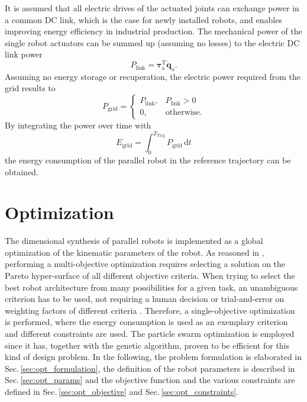 \documentclass[fleqn,a4paper,10pt]{article}
\newcommand{\bm}[1]{\mathbf{#1}}
\newcommand{\transp}[0]{{\mathrm{T}}}
\begin{document}
\begin{multicols}{2}
It is assumed that all electric drives of the actuated joints can exchange power in a common DC link, which is the case for newly installed robots, and enables improving energy efficiency in industrial production.
The mechanical power of the single robot actuators can be summed up (assuming no losses) to the electric DC link power
%
\begin{equation}
P_{\mathrm{link}}=\bm{\tau}_\mathrm{a}^\transp \dot{\bm{q}}_\mathrm{a}.
\label{equ:power_link_mech}
\end{equation}
%
Assuming no energy storage or recuperation, the electric power required from the grid results to
%
\begin{equation}
P_{\mathrm{grid}}=\left\{\begin{array}{ll} P_{\mathrm{link}}, & P_{\mathrm{link}}>0 \\0, & \mathrm{otherwise.}\end{array}\right.
\label{equ:power_link_grid}
\end{equation}
%
By integrating the power over time with
%
\begin{equation}
E_{\mathrm{grid}}=\int_{0}^{T_\mathrm{Traj}} P_{\mathrm{grid}} \, \mathrm{d}t
\label{equ:energy_integral}
\end{equation}
%
the energy consumption of the parallel robot in the reference trajectory can be obtained.

\section{Optimization}
\label{sec:opti}

The dimensional synthesis of parallel robots is implemented as a global optimization of the kinematic parameters of the robot.
As reasoned in \cite{JamwalHusXie2015,Ramirez2018}, performing a multi-objective optimization requires selecting a solution on the Pareto hyper-surface of all different objective criteria.
When trying to select the best robot architecture from many possibilities for a given task, an unambiguous criterion has to be used, not requiring a human decision \cite{Ramirez2018} or trial-and-error on weighting factors of different criteria \cite{JamwalHusXie2015}.
Therefore, a single-objective optimization is performed, where the energy consumption is used as an exemplary criterion and different constraints are used.
The particle swarm optimization is employed since it has, together with the genetic algorithm, proven to be efficient for this kind of design problem.
In the following, the problem formulation is elaborated in Sec.\,\ref{sec:opt_formulation}, the definition of the robot parameters is described in Sec.\,\ref{sec:opt_params} and the objective function and the various constraints are defined in Sec.\,\ref{sec:opt_objective} and Sec.\,\ref{sec:opt_constraints}.



\end{multicols}
\end{document}
